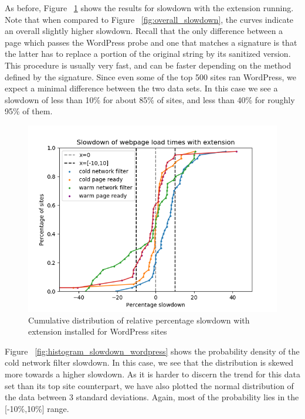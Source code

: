 As before, Figure ~\ref{fig:wordpress_slowdown} shows the results for slowdown with the extension running. Note that when compared to Figure ~\ref{fig:overall_slowdown}, the curves indicate an overall slightly higher slowdown. Recall that the only difference between a page which passes the WordPress probe and one that matches a signature is that the latter has to replace a portion of the original string by its sanitized version. This procedure is usually very fast, and can be faster depending on the method defined by the signature. Since even some of the top 500 sites ran WordPress, we expect a minimal difference between the two data sets. In this case we see a slowdown of less than 10\% for about 85\% of sites, and less than 40\% for roughly 95\% of them.

\begin{figure}[h]
	\includegraphics[scale=0.5]{results/extension_slowdown_wordpress}
	\caption{Cumulative distribution of relative percentage slowdown with extension installed for WordPress sites}
	\label{fig:wordpress_slowdown}
\end{figure}

Figure ~\ref{fig:histogram_slowdown_wordpress} shows the probability density of the cold network filter slowdown. In this case, we see that the distribution is skewed more towards a higher slowdown. As it is harder to discern the trend for this data set than its top site counterpart, we have also plotted the normal distribution of the data between 3 standard deviations. Again, most of the probability lies in the [-10\%,10\%] range.


